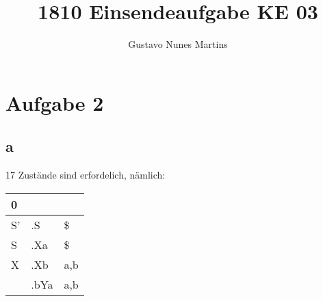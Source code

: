 \documentclass[11pt]{scrartcl}
\title{\textbf{1810 Einsendeaufgabe KE 03}}
\author{Gustavo Nunes Martins}
\begin{document}
	\maketitle
	\section*{Aufgabe 2}
	\subsection*{a}
	17 Zustände sind erfordelich, nämlich:

	\begin{tabular}{l|l|l}
		0 & & \\ \hline
		S' & .S & \$ \\ \hline
		S & .Xa & \$ \\ \hline
		X & .Xb & a,b \\
		& .bYa & a,b \\
	\end{tabular}
\end{document}
